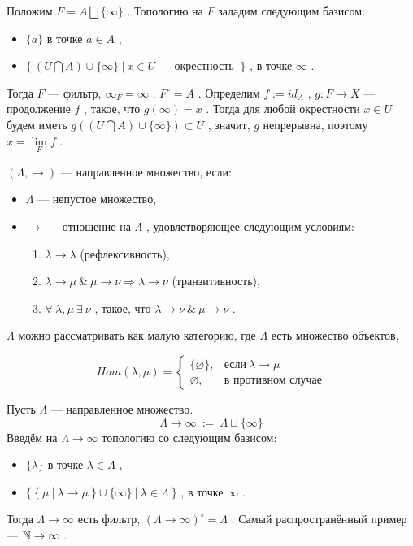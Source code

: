\SSproof

Положим \( F = A \bigsqcup \{\infty\} \) . Топологию на \( F \) зададим следующим базисом:
\begin{itemize}[label=]
\item \( \{a\} \) в точке \( a \in A \) ,
\item \( \{~( U \bigcap A ) \cup \{\infty\} ~|~ x \in U \) --- окрестность \( ~\} \) , в точке \( \infty \) .
\end{itemize}

Тогда \( F \) --- фильтр, \( \infty_F=\infty \) , \( F^\circ=A \) . Определим \( f:=id_A \) , \( g: F \rightarrow X \) --- продолжение \( f \) , такое, что \( g(\infty)=x \) . Тогда для любой окрестности \( x \in U \) будем иметь \( g(( U \bigcap A ) \cup \{\infty\}) \subset U \) , значит, \( g \) непрерывна, поэтому \( x = \lim\limits_{F} f \) .

\SSendp

\pagebreak

\SSsect[def] \( (\Lambda,\rightarrow) \) --- направленное множество, если:
\begin{itemize}[label=]
\item \( \Lambda \) --- непустое множество,   
\item \( \rightarrow \) --- отношение на \( \Lambda \) , удовлетворяющее следующим условиям:
\begin{enumerate}[label={\alph*)}]
\item \( \lambda \rightarrow \lambda \) (рефлексивность),
\item \( \lambda \rightarrow \mu ~\&~ \mu \rightarrow \nu \Rightarrow \lambda \rightarrow \nu \) (транзитивность),
\item \( \forall~\lambda,\mu ~\exists~ \nu \) , такое, что \( \lambda \rightarrow \nu ~\&~ \mu \rightarrow \nu \) .
\end{enumerate}
\end{itemize}

\( \Lambda \) можно рассматривать как малую категорию, где \( \Lambda \) есть множество объектов,

\[ Hom(\lambda,\mu)=
   \begin{cases}
   \{\varnothing\}, & \text{если} ~\lambda \rightarrow \mu \\
   \varnothing    , & \text{в противном случае}
   \end{cases}
\]

\SSsect[def] Пусть \( \Lambda \) --- направленное множество.
\[ \Lambda \rightarrow \infty ~:=~ \Lambda \sqcup \{\infty\} \]
Введём на \( \Lambda \rightarrow \infty \) топологию со следующим базисом:
\begin{itemize}[label=]
\item \( \{\lambda\} \) в точке \( \lambda \in \Lambda \) ,
\item \( \{~\{~\mu~|~\lambda\rightarrow\mu~\} \cup \{\infty\} ~|~ \lambda \in \Lambda ~\} \) , в точке \( \infty \) .
\end{itemize}
Тогда \( \Lambda \rightarrow \infty \) есть фильтр, \( (\Lambda \rightarrow \infty)^\circ=\Lambda \) . Самый распространённый пример --- \( \mathbb{N} \rightarrow \infty \) .

